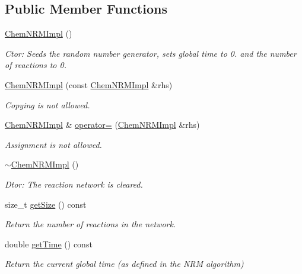 \subsection*{Public Member Functions}
\begin{DoxyCompactItemize}
\item 
\hyperlink{classchem_1_1ChemNRMImpl_ac1d00b6e06300f4959eb7e850a472ab3}{Chem\-N\-R\-M\-Impl} ()
\begin{DoxyCompactList}\small\item\em Ctor\-: Seeds the random number generator, sets global time to 0. and the number of reactions to 0. \end{DoxyCompactList}\item 
\hyperlink{classchem_1_1ChemNRMImpl_a47d840cba59a2539e65b002a6734f785}{Chem\-N\-R\-M\-Impl} (const \hyperlink{classchem_1_1ChemNRMImpl}{Chem\-N\-R\-M\-Impl} \&rhs)
\begin{DoxyCompactList}\small\item\em Copying is not allowed. \end{DoxyCompactList}\item 
\hyperlink{classchem_1_1ChemNRMImpl}{Chem\-N\-R\-M\-Impl} \& \hyperlink{classchem_1_1ChemNRMImpl_ab9a899fd0d206d67fa30f1aeac103eae}{operator=} (\hyperlink{classchem_1_1ChemNRMImpl}{Chem\-N\-R\-M\-Impl} \&rhs)
\begin{DoxyCompactList}\small\item\em Assignment is not allowed. \end{DoxyCompactList}\item 
\hyperlink{classchem_1_1ChemNRMImpl_a7ce15fefe312380122c36b0860e3014a}{$\sim$\-Chem\-N\-R\-M\-Impl} ()
\begin{DoxyCompactList}\small\item\em Dtor\-: The reaction network is cleared. \end{DoxyCompactList}\item 
size\-\_\-t \hyperlink{classchem_1_1ChemNRMImpl_a0be634b1313bcce9adc160614f34821c}{get\-Size} () const 
\begin{DoxyCompactList}\small\item\em Return the number of reactions in the network. \end{DoxyCompactList}\item 
double \hyperlink{classchem_1_1ChemNRMImpl_accb564d1778f3025c9e9a5a02e7987ec}{get\-Time} () const 
\begin{DoxyCompactList}\small\item\em Return the current global time (as defined in the N\-R\-M algorithm) \end{DoxyCompactList}\item 

\end{DoxyCompactItemize}
